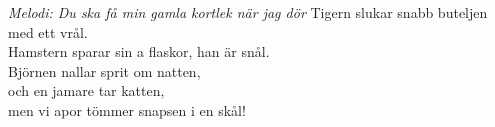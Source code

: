 {\footnotesize\textit{Melodi: Du ska få min gamla kortlek när jag dör}}
\vspace{10pt}
Tigern slukar snabb buteljen med ett vrål.\\
Hamstern sparar sin a flaskor, han är snål.\\
Björnen nallar sprit om natten, \\
och en jamare tar katten,\\
men vi apor tömmer snapsen i en skål!\\
